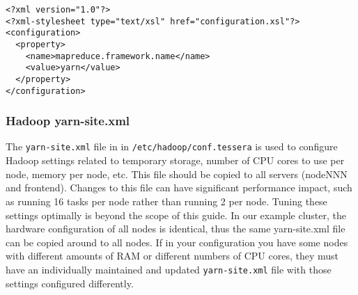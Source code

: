 \begin{verbatim}
<?xml version="1.0"?>
<?xml-stylesheet type="text/xsl" href="configuration.xsl"?>
<configuration>
  <property>
    <name>mapreduce.framework.name</name>
    <value>yarn</value>
  </property>
</configuration>
\end{verbatim}


\subsubsection{Hadoop yarn-site.xml}
The \verb|yarn-site.xml| file in in \verb|/etc/hadoop/conf.tessera|
is used to configure Hadoop settings related to temporary storage, number
of CPU cores to use per node, memory per node, etc.   This file should
be copied to all servers (nodeNNN and frontend).  Changes to this file
can have significant performance impact, such as running 16 tasks per
node rather than running 2 per node.  Tuning these settings optimally
is beyond the scope of this guide.  In our example cluster, the hardware
configuration of all nodes is identical, thus the same yarn-site.xml file
can be copied around to all nodes.  If in your configuration you have some
nodes with different amounts of RAM or different numbers of CPU cores,
they must have an individually maintained and updated \verb|yarn-site.xml|
file with those settings configured differently.

